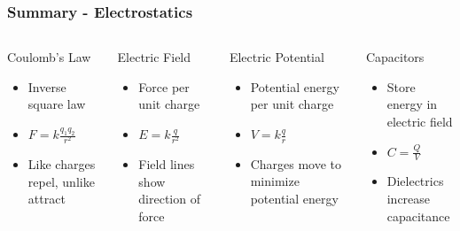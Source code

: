 \documentclass{beamer}
\begin{document}
\begin{frame}
    \frametitle{Summary - Electrostatics}
    \begin{columns}
        \begin{block}{Coulomb's Law}
            \begin{itemize}
                \item Inverse square law
                \item $F = k\frac{q_1 q_2}{r^2}$
                \item Like charges repel, unlike attract
            \end{itemize}
        \end{block}
        
        \begin{block}{Electric Field}
            \begin{itemize}
                \item Force per unit charge
                \item $E = k\frac{q}{r^2}$
                \item Field lines show direction of force
            \end{itemize}
        \end{block}
        
        \begin{block}{Electric Potential}
            \begin{itemize}
                \item Potential energy per unit charge
                \item $V = k\frac{q}{r}$
                \item Charges move to minimize potential energy
            \end{itemize}
        \end{block}
        
        \begin{block}{Capacitors}
            \begin{itemize}
                \item Store energy in electric field
                \item $C = \frac{Q}{V}$
                \item Dielectrics increase capacitance
            \end{itemize}
        \end{block}
    \end{columns}
\end{frame}
\end{document}
